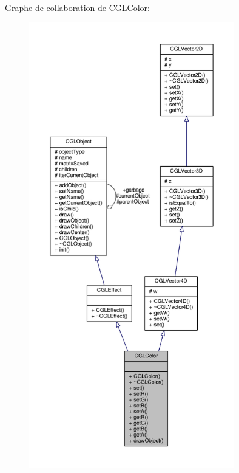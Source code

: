Graphe de collaboration de C\-G\-L\-Color\-:\nopagebreak
\begin{figure}[H]
\begin{center}
\leavevmode
\includegraphics[height=550pt]{d0/d7c/class_c_g_l_color__coll__graph}
\end{center}
\end{figure}

